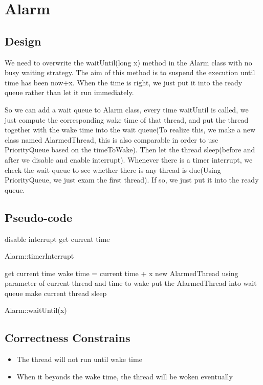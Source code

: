 \documentclass[a4paper,10pt]{article}
\begin{document}
\section{Alarm}

\subsection {Design}

We need to overwrite the waitUntil(long x) method in the Alarm class with no busy waiting strategy. The aim of this method is to suspend the execution until time has been now+x. When the time is right, we just put it into the ready queue rather than let it run immediately.

So we can add a wait queue to Alarm class, every time waitUntil is called, we just compute the corresponding wake time of that thread, and put the thread together with the wake time into the wait queue(To realize this, we make a new class named AlarmedThread, this is also comparable in order to use PriorityQueue based on the timeToWake). Then let the thread sleep(before and after we disable and enable interrupt). Whenever there is a timer interrupt, we check the wait queue to see whether there is any thread is due(Using PriorityQueue, we just exam the first thread). If so, we just put it into the ready queue.

\subsection {Pseudo-code}

\begin{algorithm}
disable interrupt
get current time\;
\caption{Alarm::timerInterrupt}
\end{algorithm}

\begin{algorithm}
get current time\;
wake time = current time + x\;
new AlarmedThread using parameter of current thread and time to wake
put the AlarmedThread into wait queue\;
make current thread sleep
\caption{Alarm::waitUntil(x)}
\end{algorithm}
\subsection{Correctness Constrains}
\begin{itemize}
\item The thread will not run until wake time
\item When it beyonds the wake time, the thread will be woken eventually
\end{itemize}
\end{document}
